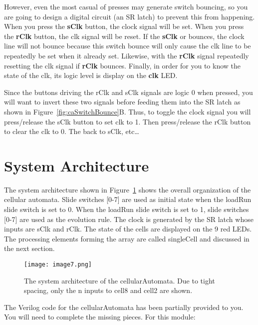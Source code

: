 However, even the most casual of presses may generate switch bouncing,
so you are going to design a digital circuit (an SR latch) to prevent
this from happening. When you press the \textbf{sClk} button, the clock
signal will be set. When you press the \textbf{rClk} button, the clk
signal will be reset. If the \textbf{sClk} or bounces, the clock line
will not bounce because this switch bounce will only cause the clk line
to be repeatedly be set when it already set. Likewise, with the
\textbf{rClk} signal repeatedly resetting the clk signal if
\textbf{rClk} bounces. Finally, in order for you to know the state of
the clk, its logic level is display on the \textbf{clk} LED.

Since the buttons driving the rClk and sClk signals are logic 0 when
pressed, you will want to invert these two signals before feeding them
into the SR latch as shown in Figure~\ref{fig:caSwitchBounce}B. Thus, to 
toggle the clock signal
you will press/release the sClk button to set clk to 1. Then
press/release the rClk button to clear the clk to 0. The back to sClk,
etc\ldots{}



\section{System Architecture}

The system architecture shown in Figure~\ref{fig:caSysArch} shows the overall organization
of the cellular automata. Slide switches {[}0-7{]} are used as initial
state when the loadRun slide switch is set to 0. When the loadRun slide
switch is set to 1, slide switches {[}0-7{]} are used as the evolution
rule. The clock is generated by the SR latch whose inputs are sClk and
rClk. The state of the cells are displayed on the 9 red LEDs. The
processing elements forming the array are called singleCell and
discussed in the next section.

\begin{figure}[ht]
\texttt{[image: image7.png]}
\caption{The system architecture of the cellularAutomata. Due to tight
spacing, only the n inputs to cell8 and cell2 are shown.}
\label{fig:caSysArch}
\end{figure}

\protect\hypertarget{cellularAutomata_verilog}{}{}The Verilog code for
the cellularAutomata has been partially provided to you. You will need
to complete the missing pieces. For this module:

